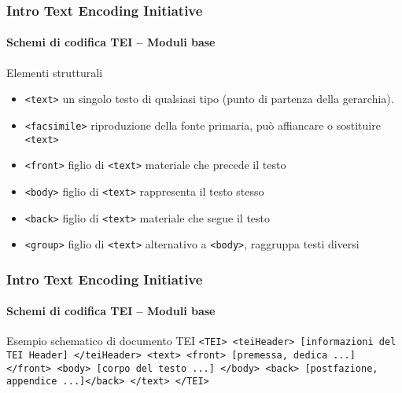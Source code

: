 \begin{frame}
	\frametitle{Intro Text Encoding Initiative}
	\framesubtitle{Schemi di codifica TEI – Moduli base}
	\addtocounter{nframe}{1}

	\begin{block}{Elementi strutturali}
        
       \begin{itemize}
           \item \texttt{<text>} un singolo testo di qualsiasi tipo (punto di partenza della gerarchia).
           \item \texttt{<facsimile>} riproduzione della fonte primaria, può affiancare o sostituire \texttt{<text>}
           \item \texttt{<front>} figlio di \texttt{<text>} materiale che precede il testo
           \item \texttt{<body>} figlio di \texttt{<text>} rappresenta il testo stesso
           \item \texttt{<back>} figlio di \texttt{<text>} materiale che segue il testo
           \item \texttt{<group>} figlio di \texttt{<text>} alternativo a \texttt{<body>}, raggruppa testi diversi
       \end{itemize}
        
    \end{block}
    
   

\end{frame}



\begin{frame}
	\frametitle{Intro Text Encoding Initiative}
	\framesubtitle{Schemi di codifica TEI – Moduli base}
	\addtocounter{nframe}{1}

	\begin{block}{Esempio schematico di documento TEI}
        \texttt{<TEI>
        <teiHeader> [informazioni del TEI Header]
        </teiHeader>
        <text>
        <front> [premessa, dedica ...] </front>
        <body> [corpo del testo ...] </body>
        <back> [postfazione, appendice ...]</back>
        </text>
        </TEI>}
    \end{block}
    
   

\end{frame}



